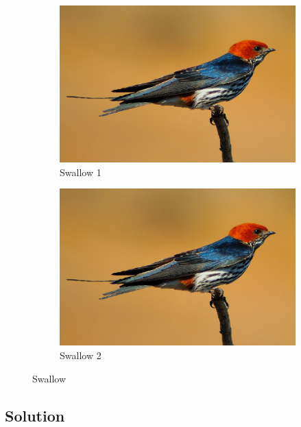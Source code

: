 \documentclass[
  UTF8, %
  12pt, %
]{assignment}
\begin{document}
\begin{figure}[H]
  \centering
  \begin{subfigure}[b]{0.4\textwidth}
    \includegraphics[width=\textwidth]{swallow.jpg}
    \caption{Swallow 1}
    \label{fig:swallow_1}
  \end{subfigure} \quad
  \begin{subfigure}[b]{0.4\textwidth}
    \includegraphics[width=\textwidth]{swallow.jpg}
    \caption{Swallow 2}
    \label{fig:swallow_2}
  \end{subfigure}
  \caption{Swallow}
  \label{fig:swallow_all}
\end{figure}


\subsection*{Solution}
\end{document}
